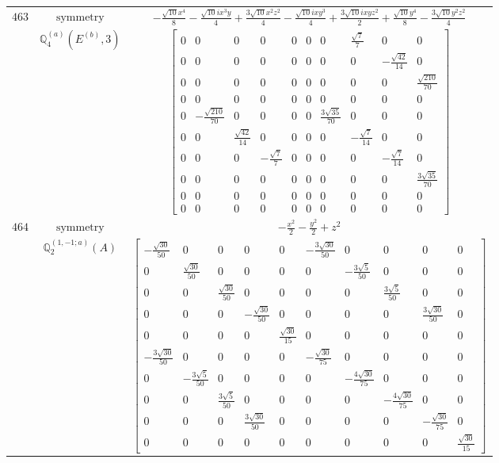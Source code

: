 \documentclass[fleqn,8pt,landscape]{jsarticle}
\begin{document}
\begin{longtable}{ccc}
$ 463 $ & $ \text{symmetry} $ & $ - \frac{\sqrt{10} x^{4}}{8} - \frac{\sqrt{10} i x^{3} y}{4} + \frac{3 \sqrt{10} x^{2} z^{2}}{4} - \frac{\sqrt{10} i x y^{3}}{4} + \frac{3 \sqrt{10} i x y z^{2}}{2} + \frac{\sqrt{10} y^{4}}{8} - \frac{3 \sqrt{10} y^{2} z^{2}}{4} $ \\
$  $ & $ \mathbb{Q}_{4}^{(a)}(E^{(b)},3) $ & $ \begin{bmatrix} 0 & 0 & 0 & 0 & 0 & 0 & 0 & \frac{\sqrt{7}}{7} & 0 & 0 \\ 0 & 0 & 0 & 0 & 0 & 0 & 0 & 0 & - \frac{\sqrt{42}}{14} & 0 \\ 0 & 0 & 0 & 0 & 0 & 0 & 0 & 0 & 0 & \frac{\sqrt{210}}{70} \\ 0 & 0 & 0 & 0 & 0 & 0 & 0 & 0 & 0 & 0 \\ 0 & - \frac{\sqrt{210}}{70} & 0 & 0 & 0 & 0 & \frac{3 \sqrt{35}}{70} & 0 & 0 & 0 \\ 0 & 0 & \frac{\sqrt{42}}{14} & 0 & 0 & 0 & 0 & - \frac{\sqrt{7}}{14} & 0 & 0 \\ 0 & 0 & 0 & - \frac{\sqrt{7}}{7} & 0 & 0 & 0 & 0 & - \frac{\sqrt{7}}{14} & 0 \\ 0 & 0 & 0 & 0 & 0 & 0 & 0 & 0 & 0 & \frac{3 \sqrt{35}}{70} \\ 0 & 0 & 0 & 0 & 0 & 0 & 0 & 0 & 0 & 0 \\ 0 & 0 & 0 & 0 & 0 & 0 & 0 & 0 & 0 & 0 \end{bmatrix} $ \\ \hline
$ 464 $ & $ \text{symmetry} $ & $ - \frac{x^{2}}{2} - \frac{y^{2}}{2} + z^{2} $ \\
$  $ & $ \mathbb{Q}_{2}^{(1,-1;a)}(A) $ & $ \begin{bmatrix} - \frac{\sqrt{30}}{50} & 0 & 0 & 0 & 0 & - \frac{3 \sqrt{30}}{50} & 0 & 0 & 0 & 0 \\ 0 & \frac{\sqrt{30}}{50} & 0 & 0 & 0 & 0 & - \frac{3 \sqrt{5}}{50} & 0 & 0 & 0 \\ 0 & 0 & \frac{\sqrt{30}}{50} & 0 & 0 & 0 & 0 & \frac{3 \sqrt{5}}{50} & 0 & 0 \\ 0 & 0 & 0 & - \frac{\sqrt{30}}{50} & 0 & 0 & 0 & 0 & \frac{3 \sqrt{30}}{50} & 0 \\ 0 & 0 & 0 & 0 & \frac{\sqrt{30}}{15} & 0 & 0 & 0 & 0 & 0 \\ - \frac{3 \sqrt{30}}{50} & 0 & 0 & 0 & 0 & - \frac{\sqrt{30}}{75} & 0 & 0 & 0 & 0 \\ 0 & - \frac{3 \sqrt{5}}{50} & 0 & 0 & 0 & 0 & - \frac{4 \sqrt{30}}{75} & 0 & 0 & 0 \\ 0 & 0 & \frac{3 \sqrt{5}}{50} & 0 & 0 & 0 & 0 & - \frac{4 \sqrt{30}}{75} & 0 & 0 \\ 0 & 0 & 0 & \frac{3 \sqrt{30}}{50} & 0 & 0 & 0 & 0 & - \frac{\sqrt{30}}{75} & 0 \\ 0 & 0 & 0 & 0 & 0 & 0 & 0 & 0 & 0 & \frac{\sqrt{30}}{15} \end{bmatrix} $ \\ \hline

\end{longtable}
\end{document}
